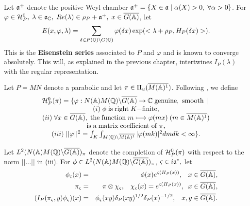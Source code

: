 Let ${\frak{a}}^{+}$ denote the positive Weyl chamber ${\frak{a}}^{+}=\{X\in 
{\frak{a}}\;|\;\alpha (X)>0,\;\forall \alpha >0\}$.
For $\varphi \in {\cal{H}}_P^0,
\;\lambda \in {\frak{a}}_{{\Bbb C}},
\;Re(\lambda )\in \rho _P+{\frak{a}}^{+},
\;x\in \overline{G({\Bbb{A}})}$, let 
\begin{equation}
E(x,\varphi ,\lambda )=
\sum_{\delta \in P({\Bbb{Q}})\backslash G({\Bbb{Q}})}
\varphi (\delta x)\exp (<\lambda +\rho _P,H_P(\delta x)>).
\end{equation}
This is the {\bf Eisenstein series} associated to $P$ and $\varphi $ and is
known to converge absolutely. This will, as explained in the previous
chapter, intertwines $I_P(\lambda)$ with the regular representation.

Let $P=MN$ denote a parabolic and let
$\pi \in \Pi _u(\overline{M({\Bbb{A}})^1})$.
Following \cite{A2}, we define 
\begin{equation}
\begin{array}{c}
{\cal H}_P^0(\pi )=\{\varphi :N({\Bbb{A}})M({\Bbb{Q}})
\backslash \overline{G({\Bbb{A}})}\rightarrow {\Bbb C}\;
{\rm genuine,\ smooth\ }|\; \\ 
(i)\;\phi \;{\rm is\;right}\;K{\rm -finite,} \\ 
(ii)\;\forall x\in \overline{G({\Bbb{A}})},
\;{\rm the\;function}\;m\longmapsto \varphi (mx)
\;(m\in \overline{M({{\Bbb{A}}})^1}) \\ 
{\rm is\;a\;matrix\;coefficient\;of}\;\pi , \\ 
(iii)\;||\varphi ||^2
=\int_K\int_{M({\Bbb{Q}})\backslash \overline{M({\Bbb{A}})^1}}|
\varphi (mk)|^2dmdk<\infty \}.
\end{array}
\end{equation}

Let $L^2(N({\Bbb{A}})M({\Bbb{Q}})\backslash \overline{G({\Bbb{A}})})_\pi $
denote the completion of ${\cal H}_P^0(\pi )$ with
respect to the norm $||...||$ in (iii). For
$\phi \in
L^2(N({\Bbb{A}})M({\Bbb{Q}})\backslash \overline{G({\Bbb{A}})})_\pi $,
$\varsigma \in i{\frak{a}}^{*},$ let
\begin{eqnarray*}
\phi _\varsigma (x)
&=&\phi (x)e^{\varsigma (H_P(x))},\;\;\;x\in \overline{G({\Bbb{A}})},
\\
\pi _\varsigma  &=&\pi \otimes \chi _\varsigma ,\;\;\;\chi _\varsigma
(x)=e^{\varsigma (H_P(x))},\;\;x\in \overline{G({\Bbb{A}})}, \\
(I_P(\pi _\varsigma ,y)\phi _\varsigma )(x) &=&\phi _\varsigma (xy)\delta
_P(xy)^{1/2}\delta _P(x)^{-1/2},\;\;\;x,y\in \overline{G({\Bbb{A}})}.
\end{eqnarray*}

